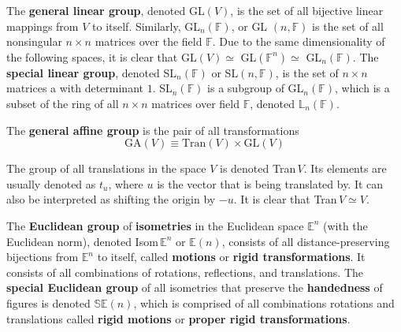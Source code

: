   \begin{definition}
    The \textbf{general linear group}, denoted GL$(V)$, is the set of all bijective linear mappings from $V$ to itself. Similarly, GL$_{n}(\mathbb{F})$, or GL $(n, \mathbb{F})$ is the set of all nonsingular $n \times n$ matrices over the field $\mathbb{F}$. Due to the same dimensionality of the following spaces, it is clear that GL$(V) \simeq$ GL$(\mathbb{F}^{n}) \simeq$ GL$_{n}(\mathbb{F})$. The \textbf{special linear group}, denoted SL$_{n} (\mathbb{F})$ or SL$(n, \mathbb{F})$, is the set of $n\times n$ matrices a with determinant $1$. SL$_{n}(\mathbb{F})$ is a subgroup of GL$_{n}(\mathbb{F})$, which is a subset of the ring of all $n \times n$ matrices over field $\mathbb{F}$, denoted $\mathbb{L}_{n}(\mathbb{F})$. 
  \end{definition}

  \begin{definition}
    The \textbf{general affine group} is the pair of all transformations
    \begin{equation}
      \text{GA} (V) \equiv \text{Tran}(V) \times \text{GL}(V)
    \end{equation}
  \end{definition}

  \begin{definition}
    The group of all translations in the space $V$ is denoted Tran$\,V$. Its elements are usually denoted as $t_{u}$, where $u$ is the vector that is being translated by. It can also be interpreted as shifting the origin by $-u$. It is clear that Tran$\,V \simeq V$. 
  \end{definition}

  \begin{definition}[Isometries]
    The \textbf{Euclidean group} of \textbf{isometries} in the Euclidean space $\mathbb{E}^{n}$ (with the Euclidean norm), denoted Isom$\, \mathbb{E}^{n}$ or $\mathbb{E}(n)$, consists of all distance-preserving bijections from $\mathbb{E}^{n}$ to itself, called \textbf{motions} or \textbf{rigid transformations}. It consists of all combinations of rotations, reflections, and translations. The \textbf{special Euclidean group} of all isometries that preserve the \textbf{handedness} of figures is denoted $\mathbb{SE}(n)$, which is comprised of all combinations rotations and translations called \textbf{rigid motions} or \textbf{proper rigid transformations}.
  \end{definition}

